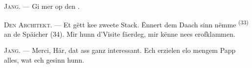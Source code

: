 \textsc{Jang}. --- Gi mer op den .

\textsc{Den Architekt}. --- Et gëtt kee zweete Stack. Ënnert dem Daach sinn nëmme
 \textsuperscript{(33)} an de Späicher (34). Mir hunn d'Visite
fäerdeg, mir kënne nees erofklammen.

\textsc{Jang}. --- Merci, Här, dat ass ganz interessant. Ech erzielen elo mengem Papp
alles, wat ech gesinn hunn.

\VUsaut{4.0mm}
\VUfilet{22mm}

